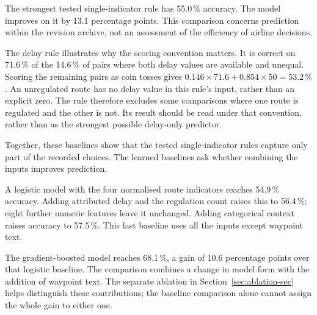 \documentclass[preprint,authoryear,12pt]{elsarticle}
\begin{document}
The strongest tested single-indicator rule has 55.0\,\% accuracy.
The model improves on it by 13.1 percentage points. This comparison
concerns prediction within the revision archive, not an assessment of
the efficiency of airline decisions.

The delay rule illustrates why the scoring convention matters. It is
correct on 71.6\,\% of the 14.6\,\% of pairs where both delay values
are available and unequal. Scoring the remaining pairs as coin tosses
gives $0.146\times71.6+0.854\times50=53.2\,\%$. An unregulated
route has no delay value in this rule's input, rather than an explicit
zero. The rule therefore excludes some comparisons where one route is
regulated and the other is not. Its result should be read under that
convention, rather than as the strongest possible delay-only predictor.

Together, these baselines show that the tested single-indicator rules
capture only part of the recorded choices. The learned baselines ask
whether combining the inputs improves prediction.

A logistic model with the four normalised route indicators reaches
54.9\,\% accuracy. Adding attributed delay and the regulation count
raises this to 56.4\,\%; eight further numeric features leave it
unchanged. Adding categorical context raises accuracy to 57.5\,\%.
This last baseline uses all the inputs except waypoint text.

The gradient-boosted model reaches 68.1\,\%, a gain of 10.6 percentage
points over that logistic baseline. The comparison combines a change in
model form with the addition of waypoint text. The separate ablation in
Section~\ref{sec:ablation-sec} helps distinguish these contributions;
the baseline comparison alone cannot assign the whole gain to either one.
\end{document}
